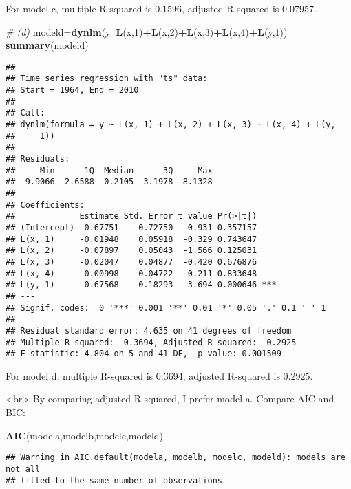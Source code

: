 \documentclass[]{article}
\newenvironment{Shaded}{\begin{snugshade}}{\end{snugshade}}
\newcommand{\KeywordTok}[1]{\textcolor[rgb]{0.13,0.29,0.53}{\textbf{#1}}}
\newcommand{\DecValTok}[1]{\textcolor[rgb]{0.00,0.00,0.81}{#1}}
\newcommand{\CommentTok}[1]{\textcolor[rgb]{0.56,0.35,0.01}{\textit{#1}}}
\newcommand{\OperatorTok}[1]{\textcolor[rgb]{0.81,0.36,0.00}{\textbf{#1}}}
\newcommand{\NormalTok}[1]{#1}
\begin{document}
\indent For model c, multiple R-squared is 0.1596, adjusted R-squared is
0.07957.

\begin{Shaded}
\begin{Highlighting}[]
\CommentTok{# (d) }
\NormalTok{modeld=}\KeywordTok{dynlm}\NormalTok{(y}\OperatorTok{~}\KeywordTok{L}\NormalTok{(x,}\DecValTok{1}\NormalTok{)}\OperatorTok{+}\KeywordTok{L}\NormalTok{(x,}\DecValTok{2}\NormalTok{)}\OperatorTok{+}\KeywordTok{L}\NormalTok{(x,}\DecValTok{3}\NormalTok{)}\OperatorTok{+}\KeywordTok{L}\NormalTok{(x,}\DecValTok{4}\NormalTok{)}\OperatorTok{+}\KeywordTok{L}\NormalTok{(y,}\DecValTok{1}\NormalTok{))}
\KeywordTok{summary}\NormalTok{(modeld)}
\end{Highlighting}
\end{Shaded}

\begin{verbatim}
## 
## Time series regression with "ts" data:
## Start = 1964, End = 2010
## 
## Call:
## dynlm(formula = y ~ L(x, 1) + L(x, 2) + L(x, 3) + L(x, 4) + L(y, 
##     1))
## 
## Residuals:
##     Min      1Q  Median      3Q     Max 
## -9.9066 -2.6588  0.2105  3.1978  8.1328 
## 
## Coefficients:
##             Estimate Std. Error t value Pr(>|t|)    
## (Intercept)  0.67751    0.72750   0.931 0.357157    
## L(x, 1)     -0.01948    0.05918  -0.329 0.743647    
## L(x, 2)     -0.07897    0.05043  -1.566 0.125031    
## L(x, 3)     -0.02047    0.04877  -0.420 0.676876    
## L(x, 4)      0.00998    0.04722   0.211 0.833648    
## L(y, 1)      0.67568    0.18293   3.694 0.000646 ***
## ---
## Signif. codes:  0 '***' 0.001 '**' 0.01 '*' 0.05 '.' 0.1 ' ' 1
## 
## Residual standard error: 4.635 on 41 degrees of freedom
## Multiple R-squared:  0.3694, Adjusted R-squared:  0.2925 
## F-statistic: 4.804 on 5 and 41 DF,  p-value: 0.001509
\end{verbatim}

\indent For model d, multiple R-squared is 0.3694, adjusted R-squared is
0.2925.

\indent <br> By comparing adjusted R-squared, I prefer model a.
\indent Compare AIC and BIC:

\begin{Shaded}
\begin{Highlighting}[]
\KeywordTok{AIC}\NormalTok{(modela,modelb,modelc,modeld)}
\end{Highlighting}
\end{Shaded}

\begin{verbatim}
## Warning in AIC.default(modela, modelb, modelc, modeld): models are not all
## fitted to the same number of observations
\end{verbatim}
\end{document}
